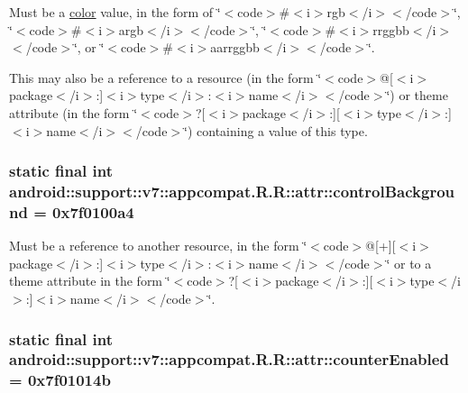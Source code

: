 Must be a \hyperlink{classandroid_1_1support_1_1v7_1_1appcompat_1_1_r_1_1color}{color} value, in the form of \char`\"{}$<$code$>$\#$<$i$>$rgb$<$/i$>$$<$/code$>$\char`\"{}, \char`\"{}$<$code$>$\#$<$i$>$argb$<$/i$>$$<$/code$>$\char`\"{}, \char`\"{}$<$code$>$\#$<$i$>$rrggbb$<$/i$>$$<$/code$>$\char`\"{}, or \char`\"{}$<$code$>$\#$<$i$>$aarrggbb$<$/i$>$$<$/code$>$\char`\"{}. 

This may also be a reference to a resource (in the form \char`\"{}$<$code$>$@\mbox{[}$<$i$>$package$<$/i$>$:\mbox{]}$<$i$>$type$<$/i$>$:$<$i$>$name$<$/i$>$$<$/code$>$\char`\"{}) or theme attribute (in the form \char`\"{}$<$code$>$?\mbox{[}$<$i$>$package$<$/i$>$:\mbox{]}\mbox{[}$<$i$>$type$<$/i$>$:\mbox{]}$<$i$>$name$<$/i$>$$<$/code$>$\char`\"{}) containing a value of this type. \hypertarget{classandroid_1_1support_1_1v7_1_1appcompat_1_1_r_1_1attr_71372fb788ababd42d0603c38f8db451}{
\subsubsection[{controlBackground}]{\setlength{\rightskip}{0pt plus 5cm}static final int android::support::v7::appcompat.R.R::attr::controlBackground = 0x7f0100a4}}
\label{classandroid_1_1support_1_1v7_1_1appcompat_1_1_r_1_1attr_71372fb788ababd42d0603c38f8db451}


Must be a reference to another resource, in the form \char`\"{}$<$code$>$@\mbox{[}+\mbox{]}\mbox{[}$<$i$>$package$<$/i$>$:\mbox{]}$<$i$>$type$<$/i$>$:$<$i$>$name$<$/i$>$$<$/code$>$\char`\"{} or to a theme attribute in the form \char`\"{}$<$code$>$?\mbox{[}$<$i$>$package$<$/i$>$:\mbox{]}\mbox{[}$<$i$>$type$<$/i$>$:\mbox{]}$<$i$>$name$<$/i$>$$<$/code$>$\char`\"{}. \hypertarget{classandroid_1_1support_1_1v7_1_1appcompat_1_1_r_1_1attr_cc348e1b28754eda93136134cb55ba8f}{
\subsubsection[{counterEnabled}]{\setlength{\rightskip}{0pt plus 5cm}static final int android::support::v7::appcompat.R.R::attr::counterEnabled = 0x7f01014b}}
\label{classandroid_1_1support_1_1v7_1_1appcompat_1_1_r_1_1attr_cc348e1b28754eda93136134cb55ba8f}


